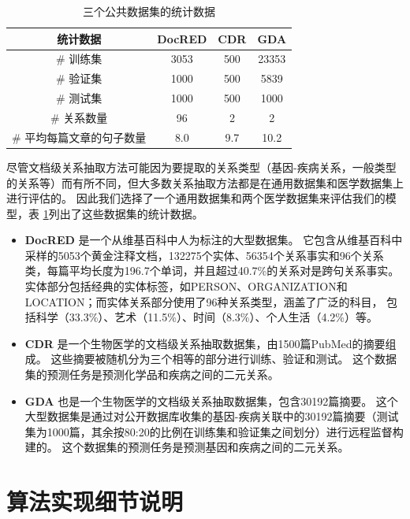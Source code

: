 \documentclass[bachelor]{thesis-uestc}
\begin{document}
\begin{table}[h]
    \caption{三个公共数据集的统计数据}\label{table_datasets}
    \begin{tabular}{cccc}
    \hline
    统计数据               & DocRED & CDR & GDA   \\ \hline
    \# 训练集                 & 3053   & 500 & 23353 \\
    \# 验证集                   & 1000   & 500 & 5839  \\
    \# 测试集                  & 1000   & 500 & 1000  \\
    \# 关系数量             & 96     & 2   & 2     \\
    \# 平均每篇文章的句子数量 & 8.0    & 9.7 & 10.2  \\ \hline
    \end{tabular}
    
\end{table} 
尽管文档级关系抽取方法可能因为要提取的关系类型（基因-疾病关系，一般类型的关系等）而有所不同，但大多数关系抽取方法都是在通用数据集和医学数据集上进行评估的。
因此我们选择了一个通用数据集和两个医学数据集来评估我们的模型，表 \ref{table_datasets}列出了这些数据集的统计数据。
\begin{itemize}
    \item \textbf{DocRED} 是一个从维基百科中人为标注的大型数据集。
    它包含从维基百科中采样的5053个黄金注释文档，132275个实体、56354个关系事实和96个关系类，每篇平均长度为196.7个单词，并且超过40.7\%的关系对是跨句关系事实。
    实体部分包括经典的实体标签，如PERSON、ORGANIZATION和LOCATION；而实体关系部分使用了96种关系类型，涵盖了广泛的科目， 包括科学（33.3\%）、艺术（11.5\%）、时间（8.3\%）、个人生活（4.2\%）等。
    \item \textbf{CDR} 是一个生物医学的文档级关系抽取数据集，由1500篇PubMed的摘要组成。
    这些摘要被随机分为三个相等的部分进行训练、验证和测试。
    这个数据集的预测任务是预测化学品和疾病之间的二元关系。
    \item \textbf{GDA} 
    也是一个生物医学的文档级关系抽取数据集，包含30192篇摘要。
    这个大型数据集是通过对公开数据库收集的基因-疾病关联中的30192篇摘要（测试集为1000篇，其余按80:20的比例在训练集和验证集之间划分）进行远程监督构建的。
    这个数据集的预测任务是预测基因和疾病之间的二元关系。
\end{itemize}

\section{算法实现细节说明}\label{sec:implementation}
\end{document}
